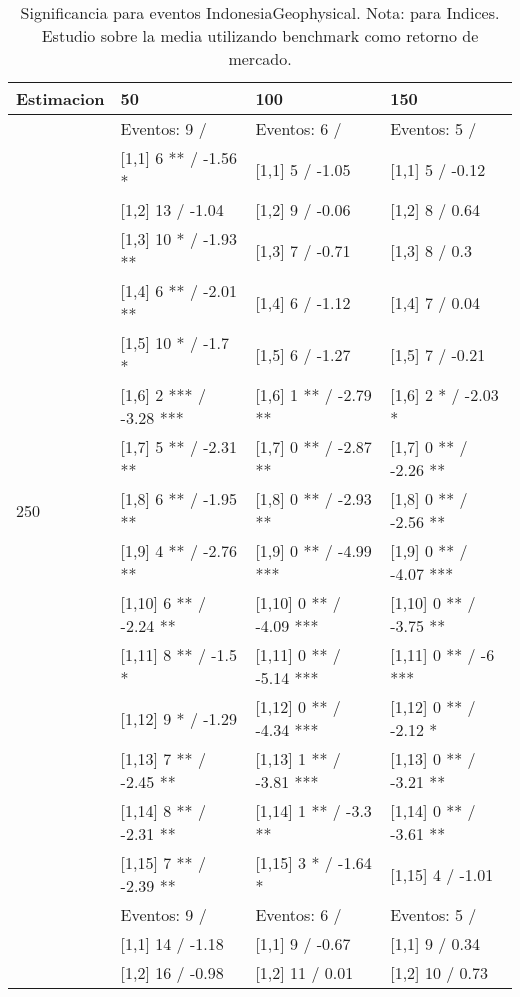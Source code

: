 \begin{table}

\caption{Significancia para eventos IndonesiaGeophysical. Nota: para Indices. Estudio sobre la media utilizando benchmark como retorno de mercado.}
\centering
\begin{tabular}[t]{llll}
\toprule
Estimacion & 50 & 100 & 150\\
\midrule
 & Eventos:  9 / & Eventos:  6 / & Eventos:  5 /\\
 & {}[1,1] 6 ** / -1.56 * & {}[1,1] 5  / -1.05 & {}[1,1] 5  / -0.12\\
 & {}[1,2] 13  / -1.04 & {}[1,2] 9  / -0.06 & {}[1,2] 8  / 0.64\\
 & {}[1,3] 10 * / -1.93 ** & {}[1,3] 7  / -0.71 & {}[1,3] 8  / 0.3\\
 & {}[1,4] 6 ** / -2.01 ** & {}[1,4] 6  / -1.12 & {}[1,4] 7  / 0.04\\
\addlinespace
 & {}[1,5] 10 * / -1.7 * & {}[1,5] 6  / -1.27 & {}[1,5] 7  / -0.21\\
 & {}[1,6] 2 *** / -3.28 *** & {}[1,6] 1 ** / -2.79 ** & {}[1,6] 2 * / -2.03 *\\
 & {}[1,7] 5 ** / -2.31 ** & {}[1,7] 0 ** / -2.87 ** & {}[1,7] 0 ** / -2.26 **\\
250 & {}[1,8] 6 ** / -1.95 ** & {}[1,8] 0 ** / -2.93 ** & {}[1,8] 0 ** / -2.56 **\\
 & {}[1,9] 4 ** / -2.76 ** & {}[1,9] 0 ** / -4.99 *** & {}[1,9] 0 ** / -4.07 ***\\
\addlinespace
 & {}[1,10] 6 ** / -2.24 ** & {}[1,10] 0 ** / -4.09 *** & {}[1,10] 0 ** / -3.75 **\\
 & {}[1,11] 8 ** / -1.5 * & {}[1,11] 0 ** / -5.14 *** & {}[1,11] 0 ** / -6 ***\\
 & {}[1,12] 9 * / -1.29 & {}[1,12] 0 ** / -4.34 *** & {}[1,12] 0 ** / -2.12 *\\
 & {}[1,13] 7 ** / -2.45 ** & {}[1,13] 1 ** / -3.81 *** & {}[1,13] 0 ** / -3.21 **\\
 & {}[1,14] 8 ** / -2.31 ** & {}[1,14] 1 ** / -3.3 ** & {}[1,14] 0 ** / -3.61 **\\
\addlinespace
 & {}[1,15] 7 ** / -2.39 ** & {}[1,15] 3 * / -1.64 * & {}[1,15] 4  / -1.01\\
 & Eventos:  9 / & Eventos:  6 / & Eventos:  5 /\\
 & {}[1,1] 14  / -1.18 & {}[1,1] 9  / -0.67 & {}[1,1] 9  / 0.34\\
 & {}[1,2] 16  / -0.98 & {}[1,2] 11  / 0.01 & {}[1,2] 10  / 0.73\\

\end{tabular}
\end{table}
